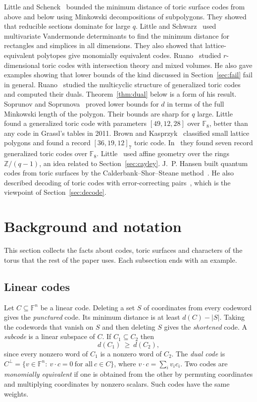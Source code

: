 \documentclass[12pt,letterpaper]{article}
\numberwithin{equation}{section}
\theoremstyle{definition}
\theoremstyle{remark}
\newcommand{\F}{\mathbb{F}}
\newcommand{\Z}{\mathbb{Z}}
\begin{document}
Little and Schenck~\cite{LS06} bounded the minimum distance of toric surface
codes from above and below using Minkowski decompositions of subpolygons. They
showed that reducible sections dominate for large $q$. Little and
Schwarz~\cite{LS07} used multivariate Vandermonde determinants to find the
minimum distance for rectangles and simplices in all dimensions. They also
showed that lattice-equivalent polytopes give monomially equivalent codes.
Ruano~\cite{Ru07} studied $r$-dimensional toric codes with intersection theory
and mixed volumes. He also gave examples showing that lower bounds of the
kind discussed in Section~\ref{sec:fail} fail in general. Ruano~\cite{Ru09} studied the multicyclic structure
of generalized toric codes and computed their duals.
Theorem~\ref{thm:dual} below is a form of his result. Soprunov and
Soprunova~\cite{SS09} proved lower bounds for $d$ in terms of the full
Minkowski length of the polygon. Their bounds are sharp for $q$ large.
Little~\cite{Li11} found a generalized toric code with parameters
$[49,12,28]$ over $\F_8$, better than any code in Grassl's tables in 2011.
Brown and Kasprzyk~\cite{BK13} classified small lattice polygons and found a
record $[36,19,12]_7$ toric code. In~\cite{BK13b} they found seven record
generalized toric codes over $\F_8$. Little~\cite{Li17} used affine geometry
over the rings $\Z/(q-1)$, an idea related to Section~\ref{sec:cayley}. J.~P.
Hansen built quantum codes from toric surfaces by the Calderbank--Shor--Steane
method~\cite{Ha13}. He also described decoding of toric codes with
error-correcting pairs~\cite{Ha17}, which is the viewpoint of
Section~\ref{sec:decode}.

\section{Background and notation}\label{sec:background}

This section collects the facts about codes, toric surfaces and characters of
the torus that the rest of the paper uses. Each subsection ends with an
example.

\subsection{Linear codes}

Let $C\subseteq\F^n$ be a linear code. Deleting a set $S$ of coordinates from
every codeword gives the \emph{punctured} code. Its minimum distance is at
least $d(C)-|S|$. Taking the codewords that vanish on $S$ and then deleting $S$
gives the \emph{shortened} code. A \emph{subcode} is a linear subspace of $C$.
If $C_1\subseteq C_2$ then
\begin{equation}\label{eq:subcode-d}
d(C_1)\ \ge\ d(C_2),
\end{equation}
since every nonzero word of $C_1$ is a nonzero word of $C_2$. The \emph{dual
code} is $C^\perp=\{v\in\F^n:\ v\cdot c=0\ \text{for all}\ c\in C\}$, where
$v\cdot c=\sum_i v_ic_i$. Two codes are \emph{monomially equivalent} if one is
obtained from the other by permuting coordinates and multiplying coordinates
by nonzero scalars. Such codes have the same weights.
\end{document}
